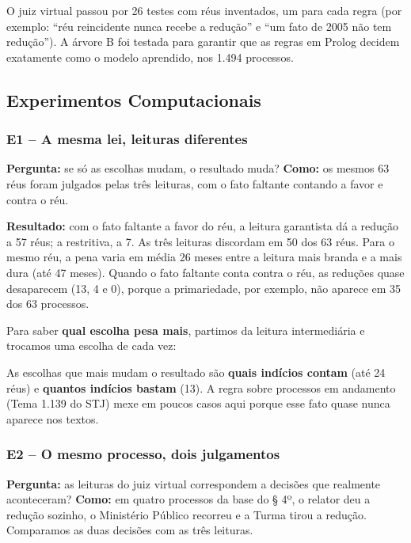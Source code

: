 \documentclass[11pt,a4paper]{article}
\begin{document}
O juiz virtual passou por 26 testes com réus inventados, um para cada regra (por exemplo:
``réu reincidente nunca recebe a redução'' e ``um fato de 2005 não tem redução''). A árvore B
foi testada para garantir que as regras em Prolog decidem exatamente como o modelo
aprendido, nos 1.494 processos.

\subsection{Experimentos Computacionais}

\subsubsection*{E1 -- A mesma lei, leituras diferentes}

\textbf{Pergunta:} se só as escolhas mudam, o resultado muda?
\textbf{Como:} os mesmos 63 réus foram julgados pelas três leituras, com o fato faltante
contando a favor e contra o réu.



\textbf{Resultado:} com o fato faltante a favor do réu, a leitura garantista dá a redução a
57 réus; a restritiva, a 7. As três leituras discordam em 50 dos 63 réus. Para o mesmo réu,
a pena varia em média 26 meses entre a leitura mais branda e a mais dura (até 47 meses).
Quando o fato faltante conta contra o réu, as reduções quase desaparecem (13, 4 e 0),
porque a primariedade, por exemplo, não aparece em 35 dos 63 processos.

Para saber \textbf{qual escolha pesa mais}, partimos da leitura intermediária e trocamos uma
escolha de cada vez:



As escolhas que mais mudam o resultado são \textbf{quais indícios contam} (até 24 réus) e
\textbf{quantos indícios bastam} (13). A regra sobre processos em andamento (Tema 1.139 do
STJ) mexe em poucos casos aqui porque esse fato quase nunca aparece nos textos.

\subsubsection*{E2 -- O mesmo processo, dois julgamentos}

\textbf{Pergunta:} as leituras do juiz virtual correspondem a decisões que realmente
aconteceram?
\textbf{Como:} em quatro processos da base do § 4º, o relator deu a redução sozinho, o
Ministério Público recorreu e a Turma tirou a redução. Comparamos as duas decisões com
as três leituras.
\end{document}
